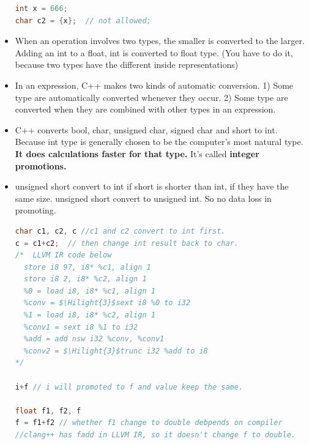 \documentclass[a4paper,12pt,twoside]{book}
\newcommand{\Hilight}[1]{\makebox[0pt][l]{\color{yellow}\rule[-3pt]{#1em}{11pt}}}
\begin{document}
\begin{itemize}
\begin{lstlisting}[frame=single, language=c++]
int x = 666;
char c2 = {x};  // not allowed;
\end{lstlisting}


\item When an operation involves two types, the smaller is converted to the larger. Adding an int to a float, int is converted to float type. (You have to do it, because two types have the different inside representations)

\item In an expression, C++ makes two kinds of automatic conversion. 1) Some type are automatically converted whenever they occur. 2) Some type are converted when they are combined with other types in an expression.

\item C++ converts bool, char, unsigned char, signed char and short to int. Because int type is generally chosen to be the computer's most natural type. \textbf{It does calculations faster for that type.} It's called \textbf{integer promotions.}

\item unsigned short convert to int if short is shorter than int, if they have the same size. unsigned short convert to unsigned int.  So no data loss in promoting.
\begin{lstlisting}[frame=single, language=c++, mathescape=true]
char c1, c2, c //c1 and c2 convert to int first.
c = c1+c2;  // then change int result back to char.
/*  LLVM IR code below
  store i8 97, i8* %c1, align 1
  store i8 2, i8* %c2, align 1
  %0 = load i8, i8* %c1, align 1
  %conv = $\Hilight{3}$sext i8 %0 to i32
  %1 = load i8, i8* %c2, align 1
  %conv1 = sext i8 %1 to i32
  %add = add nsw i32 %conv, %conv1
  %conv2 = $\Hilight{3}$trunc i32 %add to i8
*/

i+f // i will promoted to f and value keep the same.

float f1, f2, f
f = f1+f2 // whether f1 change to double debpends on compiler
//clang++ has fadd in LLVM IR, so it doesn't change f to double.
\end{lstlisting}
\end{itemize}
\end{document}
